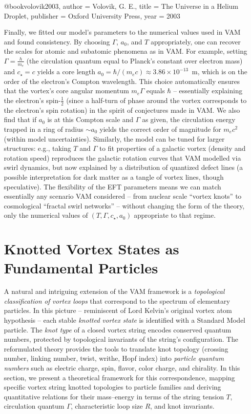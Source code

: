 \documentclass[12pt]{article}
\begin{document}
@book{volovik2003,
  author = {Volovik, G. E.},
  title = {The Universe in a Helium Droplet},
  publisher = {Oxford University Press},
  year = {2003}
}

Finally, we fitted our model’s parameters to the numerical values used in VAM and found consistency. By choosing $\Gamma$, $a_0$, and $T$ appropriately, one can recover the scales for atomic and subatomic phenomena as in VAM. For example, setting $\Gamma = \frac{h}{m_e}$ (the circulation quantum equal to Planck’s constant over electron mass) and $c_\star = c$ yields a core length $a_0 = \hbar/(m_e c) \approx 3.86\times10^{-13}$~m, which is on the order of the electron’s Compton wavelength. This choice automatically ensures that the vortex’s core angular momentum $m_e \Gamma$ equals $\hbar$ – essentially explaining the electron’s spin-$\tfrac{1}{2}$ (since a half-turn of phase around the vortex corresponds to the electron’s spin rotation) in the spirit of conjectures made in VAM. We also find that if $a_0$ is at this Compton scale and $\Gamma$ as given, the circulation energy trapped in a ring of radius $\sim a_0$ yields the correct order of magnitude for $m_e c^2$ (within model uncertainties). Similarly, the model can be tuned for larger structures: e.g., taking $T$ and $\Gamma$ to fit properties of a galactic vortex (density and rotation speed) reproduces the galactic rotation curves that VAM modelled via swirl dynamics, but now explained by a distribution of quantized defect lines (a possible interpretation for dark matter as a tangle of vortex lines, though speculative). The flexibility of the EFT parameters means we can match essentially any scenario VAM considered – from nuclear scale “vortex knots” to cosmological “fractal swirl networks” – without changing the form of the theory, only the numerical values of $(T, \Gamma, c_\star, a_0)$ appropriate to that regime.

\section{Knotted Vortex States as Fundamental Particles}
A natural and intriguing extension of the VAM framework is a \emph{topological classification of vortex loops} that correspond to the spectrum of elementary particles\cite{arxiv2407.11731}. In this picture – reminiscent of Lord Kelvin’s original vortex atom hypothesis\cite{arxiv2407.11731} – each stable \emph{knotted vortex state} is identified with a Standard Model particle. The \emph{knot type} of a closed vortex string encodes conserved quantum numbers, protected by topological invariants of the string’s configuration. The reformulated theory provides the tools to translate knot topology (crossing number, linking number, twist, writhe, Hopf index) into \emph{particle quantum numbers} such as electric charge, spin, flavor, color charge, and chirality. In this section, we present a theoretical framework for this correspondence, mapping specific vortex string knotted topologies to particle families and deriving quantitative relations for their mass–energy in terms of the string tension $T$, circulation quantum $\Gamma$, characteristic loop size $R$, and knot invariants.
\end{document}
